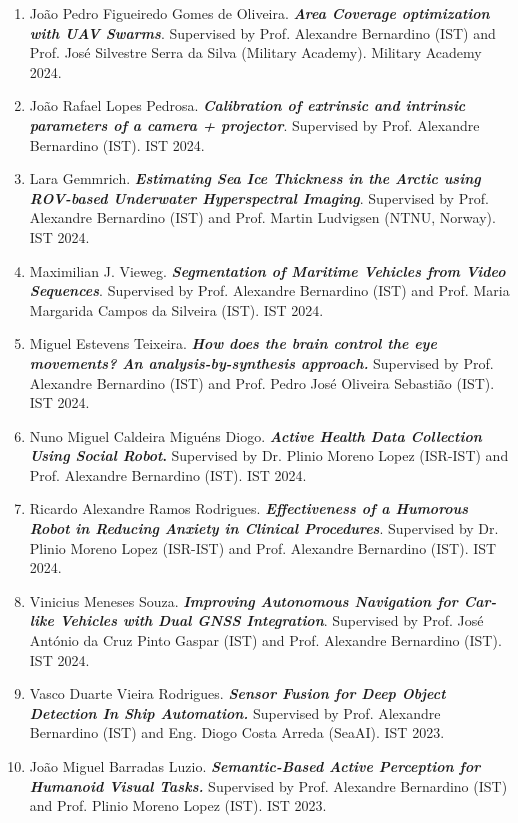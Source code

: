 \documentclass[
]{article}
\begin{document}
\begin{enumerate}
  Academy). IST 2024.
\item
  João Pedro Figueiredo Gomes de Oliveira. \emph{\textbf{Area Coverage
  optimization with UAV Swarms}}. Supervised by Prof. Alexandre
  Bernardino (IST) and Prof. José Silvestre Serra da Silva (Military
  Academy). Military Academy 2024.
\item
  João Rafael Lopes Pedrosa. \emph{\textbf{Calibration of extrinsic and
  intrinsic parameters of a camera + projector}}. Supervised by Prof.
  Alexandre Bernardino (IST). IST 2024.
\item
  Lara Gemmrich. \emph{\textbf{Estimating Sea Ice Thickness in the
  Arctic using ROV-based Underwater Hyperspectral Imaging}}. Supervised
  by Prof. Alexandre Bernardino (IST) and Prof. Martin Ludvigsen (NTNU,
  Norway). IST 2024.
\item
  Maximilian J. Vieweg. \emph{\textbf{Segmentation of Maritime Vehicles
  from Video Sequences}}. Supervised by Prof. Alexandre Bernardino (IST)
  and Prof. Maria Margarida Campos da Silveira (IST). IST 2024.
\item
  Miguel Estevens Teixeira. \emph{\textbf{How does the brain control the
  eye movements? An analysis-by-synthesis approach.}} Supervised by
  Prof. Alexandre Bernardino (IST) and Prof. Pedro José Oliveira
  Sebastião (IST). IST 2024.
\item
  Nuno Miguel Caldeira Miguéns Diogo. \textbf{\emph{Active Health Data
  Collection Using Social Robot}.} Supervised by Dr. Plinio Moreno Lopez
  (ISR-IST) and Prof. Alexandre Bernardino (IST). IST 2024.
\item
  Ricardo Alexandre Ramos Rodrigues. \emph{\textbf{Effectiveness of a
  Humorous Robot in Reducing Anxiety in Clinical Procedures}}.
  Supervised by Dr. Plinio Moreno Lopez (ISR-IST) and Prof. Alexandre
  Bernardino (IST). IST 2024.
\item
  Vinicius Meneses Souza. \emph{\textbf{Improving Autonomous Navigation
  for Car-like Vehicles with Dual GNSS Integration}}. Supervised by
  Prof. José António da Cruz Pinto Gaspar (IST) and Prof. Alexandre
  Bernardino (IST). IST 2024.
\item
  Vasco Duarte Vieira Rodrigues. \emph{\textbf{Sensor Fusion for Deep
  Object Detection In Ship Automation.}} Supervised by Prof. Alexandre
  Bernardino (IST) and Eng. Diogo Costa Arreda (SeaAI). IST 2023.
\item
  João Miguel Barradas Luzio. \emph{\textbf{Semantic-Based Active
  Perception for Humanoid Visual Tasks.}} Supervised by Prof. Alexandre
  Bernardino (IST) and Prof. Plinio Moreno Lopez (IST). IST 2023.

\end{enumerate}
\end{document}

